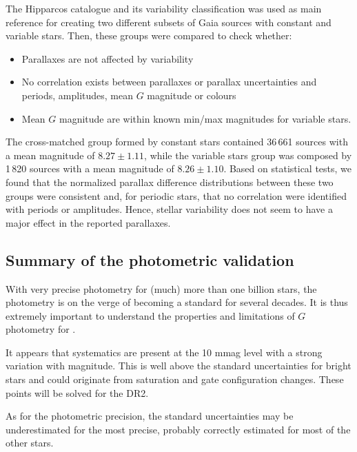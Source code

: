 The Hipparcos catalogue and its variability classification was used as main reference for creating two different subsets of Gaia sources with constant and variable stars. Then, these groups were compared to check whether:

    \begin {itemize}
    \item Parallaxes are not affected by variability
    \item No correlation exists between parallaxes or parallax uncertainties and periods, amplitudes, mean $G$ magnitude or colours
    \item Mean $G$ magnitude are within known min/max magnitudes for variable stars.
    \end {itemize}

The cross-matched group formed by constant stars contained 36\,661 sources with a mean {\gmag} magnitude of $8.27\pm1.11$, while the variable stars group was composed by 1\,820 sources with a mean {\gmag} magnitude of $8.26\pm1.10$. Based on statistical tests, we found that the normalized parallax difference distributions between these two groups were consistent and, for periodic stars, that no correlation were identified with periods or amplitudes. Hence, stellar variability does not seem to have a major effect in the reported {} parallaxes. 



\subsection{Summary of the photometric validation}\label{sec:summary-photo}

With very precise photometry for (much) more than one billion stars, 
the {\gaia} photometry is on the verge of becoming a standard for
several decades. It is thus extremely important to understand the
properties and limitations of $G$ photometry for {}.

It appears that systematics are present at the 10 mmag 
level with a strong variation with magnitude. This
is well above the standard uncertainties for bright stars and
could originate from saturation and gate configuration changes.
These points will be solved for the DR2. 

As for the photometric precision, the standard uncertainties may be 
underestimated for the most precise, 
 probably correctly estimated for most of the other stars.
